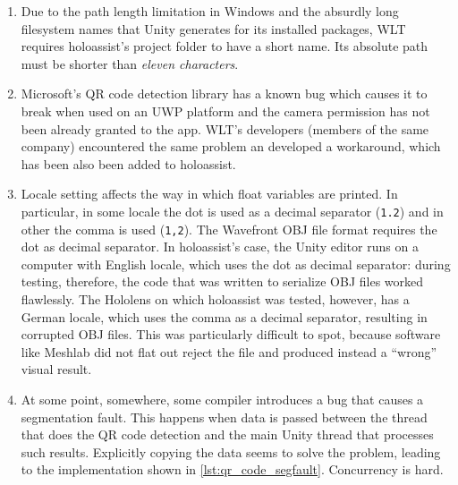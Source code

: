\begin{enumerate}
    \item Due to the path length limitation in Windows and the absurdly long filesystem names that Unity generates for its installed packages, \gls{WLT} requires \gls{holoassist}'s project folder to have a short name. Its absolute path must be shorter than \emph{eleven characters}\cite{microsoft_corporation_initial_nodate}.
    \item Microsoft's QR code detection library has a known bug which causes it to break when used on an UWP platform and the camera permission has not been already granted to the app. \gls{WLT}'s developers (members of the same company) encountered the same problem an developed a workaround\cite{finch_qr_nodate}, which has been also been added to \gls{holoassist}.
    \item Locale setting affects the way in which float variables are printed. In particular, in some locale the dot is used as a decimal separator (\texttt{1.2}) and in other the comma is used (\texttt{1,2}). The Wavefront OBJ file format requires the dot as decimal separator. In \gls{holoassist}'s case, the Unity editor runs on a computer with English locale, which uses the dot as decimal separator: during testing, therefore, the code that was written to serialize OBJ files worked flawlessly. The Hololens on which \gls{holoassist} was tested, however, has a German locale, which uses the comma as a decimal separator, resulting in corrupted OBJ files. This was particularly difficult to spot, because software like Meshlab did not flat out reject the file and produced instead a \enquote{wrong} visual result.
    \item At some point, somewhere, some compiler introduces a bug that causes a segmentation fault. This happens when data is passed between the thread that does the QR code detection and the main Unity thread that processes such results. Explicitly copying the data seems to solve the problem, leading to the implementation shown in \autoref{lst:qr_code_segfault}. Concurrency is hard.
\end{enumerate}

